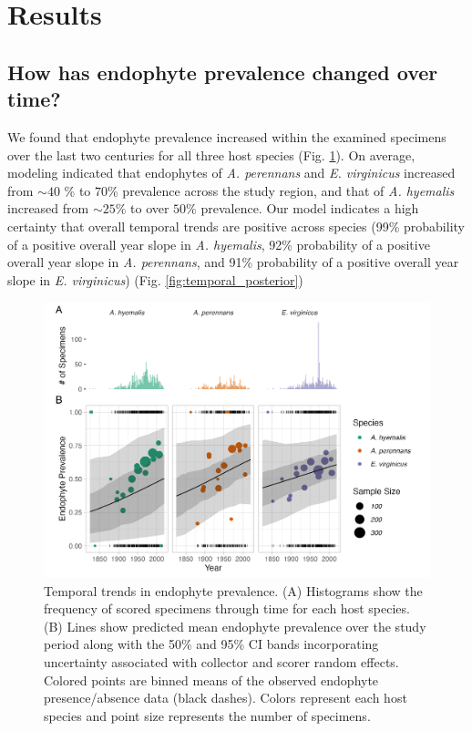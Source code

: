 \documentclass[11pt]{article}
\begin{document}
\section*{Results}
\subsection*{How has endophyte prevalence changed over time?}
We found that endophyte prevalence increased within the examined specimens over the last two centuries for all three host species (Fig. \ref{fig:temporal}). 
On average, modeling indicated that endophytes of \emph{A. perennans} and \emph{E. virginicus} increased from $\sim 40$ \% to  $70$\% prevalence across the study region, and that of \emph{A. hyemalis} increased from $\sim 25$\% to over $50$\% prevalence.
Our model indicates a high certainty that overall temporal trends are positive across species (99\% probability of a positive overall year slope in \emph{A. hyemalis}, 92\% probability of a positive overall year slope in \emph{A. perennans}, and 91\% probability of a positive overall year slope in \emph{E. virginicus}) (Fig. \ref{fig:temporal_posterior})

\begin{figure}[H]
	\centering
	\includegraphics[width = \linewidth]{../Plots/year_plot.png}
	\caption[Temporal trends in endophyte prevalence.]{Temporal trends in endophyte prevalence. (A) Histograms show the frequency of scored specimens through time for each host species. (B) Lines show predicted mean endophyte prevalence over the study period along with the 50\%  and 95\% CI bands incorporating uncertainty associated with collector and scorer random effects. Colored points are binned means of the observed endophyte presence/absence data (black dashes). Colors represent each host species and point size represents the number of specimens.}
	\label{fig:temporal}
\end{figure}
\end{document}
